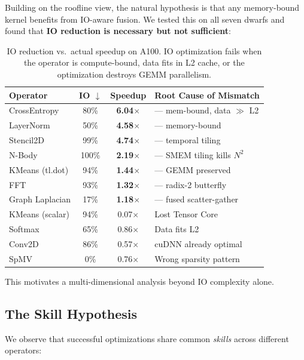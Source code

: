 \documentclass[sigconf,nonacm]{acmart}
\begin{document}
Building on the roofline view, the natural hypothesis is that any
memory-bound kernel benefits from IO-aware fusion. We tested this on
all seven dwarfs and found that \textbf{IO reduction is necessary but
not sufficient}:

\begin{table}[h]
\centering
\caption{IO reduction vs.\ actual speedup on A100. IO optimization fails when the operator is compute-bound, data fits in L2 cache, or the optimization destroys GEMM parallelism.}
\label{tab:io-vs-speedup}
\setlength{\tabcolsep}{3pt}
\small
\begin{tabular}{lccl}
\toprule
Operator & IO $\downarrow$ & Speedup & Root Cause of Mismatch \\
\midrule
CrossEntropy    & 80\%  & \textbf{6.04$\times$} & --- mem-bound, data $\gg$ L2 \\
LayerNorm       & 50\%  & \textbf{4.58$\times$} & --- memory-bound \\
Stencil2D       & 99\%  & \textbf{4.74$\times$} & --- temporal tiling \\
N-Body          & 100\% & \textbf{2.19$\times$} & --- SMEM tiling kills $N^2$ \\
KMeans (tl.dot) & 94\%  & \textbf{1.44$\times$} & --- GEMM preserved \\
FFT             & 93\%  & \textbf{1.32$\times$} & --- radix-2 butterfly \\
Graph Laplacian & 17\%  & \textbf{1.18$\times$} & --- fused scatter-gather \\
\midrule
KMeans (scalar) & 94\% & 0.07$\times$ & Lost Tensor Core \\
Softmax         & 65\% & 0.86$\times$ & Data fits L2 \\
Conv2D          & 86\% & 0.57$\times$ & cuDNN already optimal \\
SpMV            & 0\%  & 0.76$\times$ & Wrong sparsity pattern \\
\bottomrule
\end{tabular}
\end{table}

This motivates a multi-dimensional analysis beyond IO complexity alone.

\subsection{The Skill Hypothesis}

We observe that successful optimizations share common \emph{skills} across different operators:
\end{document}
